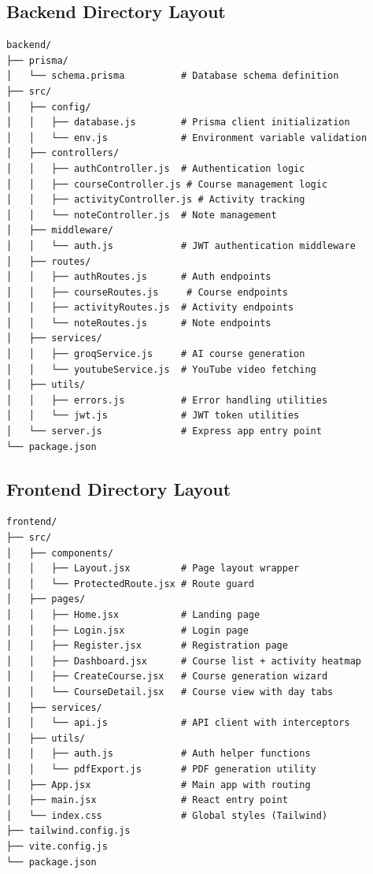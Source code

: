 \documentclass[12pt,a4paper]{report}
\begin{document}
\subsection{Backend Directory Layout}
\begin{lstlisting}[language={},caption={Backend Project Structure},label={lst:backend-structure}]
backend/
├── prisma/
│   └── schema.prisma          # Database schema definition
├── src/
│   ├── config/
│   │   ├── database.js        # Prisma client initialization
│   │   └── env.js             # Environment variable validation
│   ├── controllers/
│   │   ├── authController.js  # Authentication logic
│   │   ├── courseController.js # Course management logic
│   │   ├── activityController.js # Activity tracking
│   │   └── noteController.js  # Note management
│   ├── middleware/
│   │   └── auth.js            # JWT authentication middleware
│   ├── routes/
│   │   ├── authRoutes.js      # Auth endpoints
│   │   ├── courseRoutes.js     # Course endpoints
│   │   ├── activityRoutes.js  # Activity endpoints
│   │   └── noteRoutes.js      # Note endpoints
│   ├── services/
│   │   ├── groqService.js     # AI course generation
│   │   └── youtubeService.js  # YouTube video fetching
│   ├── utils/
│   │   ├── errors.js          # Error handling utilities
│   │   └── jwt.js             # JWT token utilities
│   └── server.js              # Express app entry point
└── package.json
\end{lstlisting}

\subsection{Frontend Directory Layout}
\begin{lstlisting}[language={},caption={Frontend Project Structure},label={lst:frontend-structure}]
frontend/
├── src/
│   ├── components/
│   │   ├── Layout.jsx         # Page layout wrapper
│   │   └── ProtectedRoute.jsx # Route guard
│   ├── pages/
│   │   ├── Home.jsx           # Landing page
│   │   ├── Login.jsx          # Login page
│   │   ├── Register.jsx       # Registration page
│   │   ├── Dashboard.jsx      # Course list + activity heatmap
│   │   ├── CreateCourse.jsx   # Course generation wizard
│   │   └── CourseDetail.jsx   # Course view with day tabs
│   ├── services/
│   │   └── api.js             # API client with interceptors
│   ├── utils/
│   │   ├── auth.js            # Auth helper functions
│   │   └── pdfExport.js       # PDF generation utility
│   ├── App.jsx                # Main app with routing
│   ├── main.jsx               # React entry point
│   └── index.css              # Global styles (Tailwind)
├── tailwind.config.js
├── vite.config.js
└── package.json
\end{lstlisting}
\end{document}
